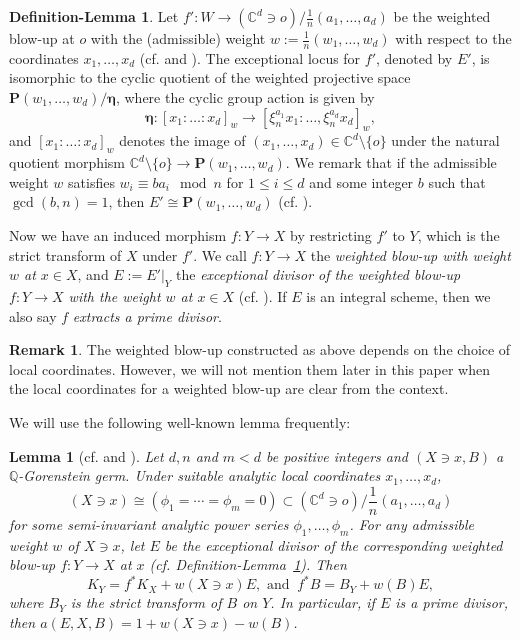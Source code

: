 \documentclass[11pt]{amsart}
\numberwithin{equation}{section}
\newcommand\han[1]{\todo[color=yellow!40]{#1}} %
\newcommand{\Cc}{\mathbb{C}}
\newcommand{\Qq}{\mathbb{Q}}
\newtheorem{lem}[thm]{Lemma}
\theoremstyle{definition}
\newtheorem{rem}[thm]{Remark}
\newtheorem{deflem}[thm]{Definition-Lemma}
\theoremstyle{definition}
\begin{document}
\begin{deflem}\label{defn: exceptional divisor and weighted blow-up}
Let $f': W\to (\Cc^d\ni o)/\frac{1}{n}(a_1,\dots,a_d)$ be the weighted blow-up at $o$ with the (admissible) weight $w:=\frac{1}{n}(w_1,\dots,w_d)$ with respect to the coordinates $x_1,\dots,x_d$ (cf. \cite[\S 10]{KM92} and \cite[\S 3.2]{Hay99}). The exceptional locus for $f'$, denoted by $E'$, is isomorphic to the cyclic quotient of the weighted projective space $\mathbf{P}(w_1,\dots,w_d)/\bm \eta$, where the cyclic group action is given by $$\bm \eta: [x_1:\dots:x_d]_w\to [\xi_n^{a_1}x_1:\dots,\xi_n^{a_d}x_d]_w,$$ and $[x_1:\dots:x_d]_w$ denotes the image of $(x_1,\dots,x_d)\in \Cc^d\setminus \{o\}$ under the natural quotient morphism $ \Cc^d\setminus\{o\}\to \mathbf{P}(w_1,\dots,w_d)$. We remark that if the admissible weight $w$ satisfies $w_i\equiv b a_i\mod n$ for $1\leq i\leq d$ and some integer $b$ such that $\gcd(b,n)=1$, then $E'\cong \mathbf{P}(w_1,\dots,w_d)$ (cf. \cite[\S 3.2]{Hay99}).


Now we have an induced morphism $f: Y\to X$ by restricting $f'$ to $Y$, which is the strict transform of $X$ under $f'$. We call $f: Y\to X$ the \emph{weighted blow-up with weight $w$ at $x\in X$}, and $E:=E'|_{Y}$ the \emph{exceptional divisor of the weighted blow-up $f: Y\to X$ with the weight $w$ at $x\in X$} (cf. \cite[\S 3.7]{Hay99}). If $E$ is an integral scheme, then we also say $f$ \emph{extracts a prime divisor}.
\end{deflem}

\begin{rem}
The weighted blow-up constructed as above depends on the choice of local coordinates. However, we will not mention them later in this paper when the local coordinates for a weighted blow-up are clear from the context.
\end{rem}


We will use the following well-known lemma frequently: %
\begin{lem}[cf. {\cite[the proof of Theorem 2]{Mor85} and \cite[\S 3.9]{Hay99}}]\label{lem: weighted blowup log discrepancies}
Let $d,n$ and $m<d$ be positive integers and $(X\ni x,B)$ a $\Qq$-Gorenstein germ. Under suitable analytic local coordinates $x_1,\dots,x_d$,
$$(X\ni x)\cong (\phi_1=\cdots=\phi_m=0)\subset (\mathbb C^d\ni o)/\frac{1}{n}(a_1,\dots,a_d)$$ for some semi-invariant analytic power series $\phi_1,\dots, \phi_m$. For any admissible weight $w$ of $X\ni x$, let $E$ be the exceptional divisor of the corresponding weighted blow-up $f: Y\rightarrow X$ at $x$ (cf. Definition-Lemma~\ref{defn: exceptional divisor and weighted blow-up}). Then 
$$K_Y=f^*K_X+w(X\ni x)E, \text{ and }~f^*B=B_Y+w(B)E,$$
where $B_Y$ is the strict transform of $B$ on $Y$. In particular, if $E$ is a prime divisor, then $a(E,X,B)=1+w(X\ni x)-w(B)$.
\end{lem}
\end{document}
